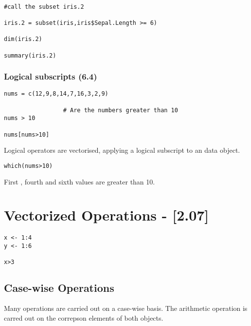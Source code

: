 \begin{framed}
\begin{verbatim}

#call the subset iris.2

iris.2 = subset(iris,iris$Sepal.Length >= 6)

dim(iris.2)

summary(iris.2)

\end{verbatim}
\end{framed}

\subsubsection*{Logical subscripts (6.4)}
\begin{framed}
\begin{verbatim}
nums = c(12,9,8,14,7,16,3,2,9)

                 # Are the numbers greater than 10
nums > 10

nums[nums>10]
\end{verbatim}
\end{framed}

Logical operators are vectorised, applying a logical subscript to an data object.

\begin{framed}
\begin{verbatim}
which(nums>10)
\end{verbatim}
\end{framed}

First , fourth and sixth values are greater than 10.
\newpage
\section*{Vectorized Operations - [2.07]}

\begin{framed}
\begin{verbatim}
x <- 1:4
y <- 1:6

x>3
\end{verbatim}
\end{framed}
\subsection*{Case-wise Operations}
Many operations are carried out on a case-wise basis. 
The arithmetic operation is carred out on the correpson elements of both objects.

